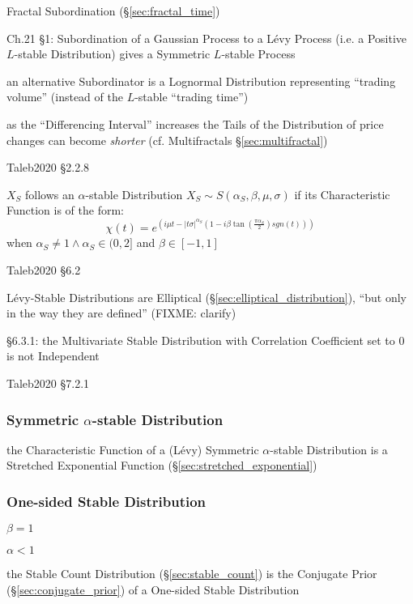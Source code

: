 Fractal Subordination (\S\ref{sec:fractal_time})

Ch.21 \S 1: Subordination of a Gaussian Process to a L\'evy Process (i.e. a
Positive $L$-stable Distribution) gives a Symmetric $L$-stable Process

an alternative Subordinator is a Lognormal Distribution representing ``trading
volume'' (instead of the $L$-stable ``trading time'')

as the ``Differencing Interval'' increases the Tails of the Distribution of
price changes can become \emph{shorter} (cf. Multifractals
\S\ref{sec:multifractal})

\asterism

Taleb2020 \S 2.2.8

$X_S$ follows an $\alpha$-stable Distribution
$X_S \sim S(\alpha_S, \beta, \mu, \sigma)$ if its Characteristic Function is of
the form:
\[
  \chi(t) =
    e^{(i\mu t
      - |t\sigma|^{\alpha_S} (1 - i\beta \tan(\frac{\pi\alpha_S}{2}) sgn(t))
    )}
\]
when $\alpha_S \neq 1 \wedge \alpha_S \in (0, 2]$ and $\beta \in [-1, 1]$

Taleb2020 \S 6.2

L\'evy-Stable Distributions are Elliptical
(\S\ref{sec:elliptical_distribution}), ``but only in the way they are defined''
(FIXME: clarify)

\S 6.3.1: the Multivariate Stable Distribution with Correlation Coefficient set
to $0$ is not Independent

Taleb2020 \S 7.2.1



\subsubsection{Symmetric $\alpha$-stable Distribution}
\label{sec:symmetric_alpha_stable}

the Characteristic Function of a (L\'evy) Symmetric $\alpha$-stable Distribution
is a Stretched Exponential Function (\S\ref{sec:stretched_exponential})



\subsubsection{One-sided Stable Distribution}\label{sec:onesided_stable}

$\beta = 1$

$\alpha < 1$

the Stable Count Distribution (\S\ref{sec:stable_count}) is the Conjugate Prior
(\S\ref{sec:conjugate_prior}) of a One-sided Stable Distribution



